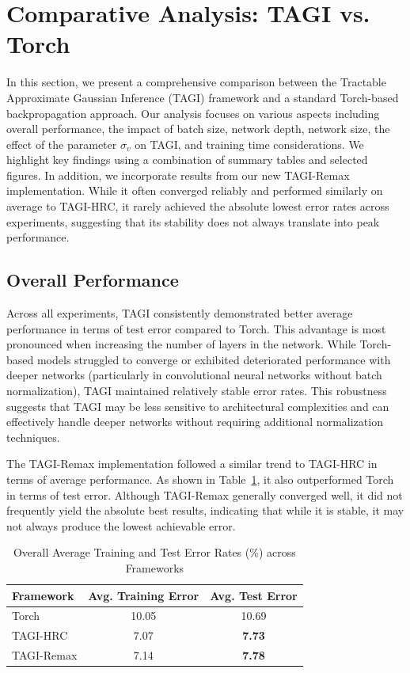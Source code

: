 \documentclass{article}
\begin{document}
\section{Comparative Analysis: TAGI vs. Torch}\label{sec:tagi_vs_torch}

In this section, we present a comprehensive comparison between the Tractable Approximate Gaussian Inference (TAGI) framework and a standard Torch-based backpropagation approach. Our analysis focuses on various aspects including overall performance, the impact of batch size, network depth, network size, the effect of the parameter $\sigma_v$ on TAGI, and training time considerations. We highlight key findings using a combination of summary tables and selected figures. In addition, we incorporate results from our new TAGI-Remax implementation. While it often converged reliably and performed similarly on average to TAGI-HRC, it rarely achieved the absolute lowest error rates across experiments, suggesting that its stability does not always translate into peak performance.

\subsection{Overall Performance}
Across all experiments, TAGI consistently demonstrated better average performance in terms of test error compared to Torch. This advantage is most pronounced when increasing the number of layers in the network. While Torch-based models struggled to converge or exhibited deteriorated performance with deeper networks (particularly in convolutional neural networks without batch normalization), TAGI maintained relatively stable error rates. This robustness suggests that TAGI may be less sensitive to architectural complexities and can effectively handle deeper networks without requiring additional normalization techniques.

The TAGI-Remax implementation followed a similar trend to TAGI-HRC in terms of average performance. As shown in Table~\ref{tab:overall_performance}, it also outperformed Torch in terms of test error. Although TAGI-Remax generally converged well, it did not frequently yield the absolute best results, indicating that while it is stable, it may not always produce the lowest achievable error.

\begin{table}[h]
\centering
\caption{Overall Average Training and Test Error Rates (\%) across Frameworks}
\label{tab:overall_performance}
\begin{small}
\begin{tabular}{lcc}
\toprule
Framework & Avg. Training Error & Avg. Test Error \\
\midrule
Torch      & 10.05 & 10.69 \\
TAGI-HRC   & 7.07  & \textbf{7.73}  \\
TAGI-Remax & 7.14  & \textbf{7.78}  \\
\bottomrule
\end{tabular}
\end{small}
\end{table}
\end{document}
